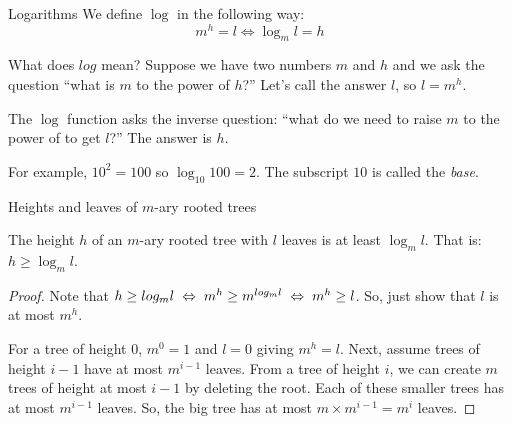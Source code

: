 \documentclass{beamer}
\begin{document}
  \begin{frame}{Logarithms}
    We define $\log$ in the following way:
    \[ m^h = l \Leftrightarrow \log_m l = h \]
  
    \begin{alertblock}{What does $log$ mean?}
      Suppose we have two numbers $m$ and $h$ and we ask the question ``what is $m$ to the power of $h$?''
      Let's call the answer $l$, so $l = m^h$.
  
      The $\log$ function asks the inverse question: ``what do we need to raise $m$ to the power of to get $l$?''
      The answer is $h$.
  
      For example, $10^2 = 100$ so $\log_{10} 100 = 2$.
      The subscript $10$ is called the \emph{base}.
    \end{alertblock}
  \end{frame}
  
  \begin{frame}{Heights and leaves of $m$-ary rooted trees}
    \begin{theorem}
      The height $h$ of an $m$-ary rooted tree with $l$ leaves is at least $\log_m l$.
      That is: $h \geq \log_m l$.
    \end{theorem}
    \begin{proof}
      Note that $h \geq log_m l \hspace{0.1cm} \Leftrightarrow \hspace{0.1cm} m^h \geq m^{log_m l} \hspace{0.1cm} \Leftrightarrow \hspace{0.1cm} m^h \geq l$.
      So, just show that $l$ is at most $m^h$.
      
      For a tree of height 0, $m^0 = 1$ and $l=0$ giving $m^h = l$.
      Next, assume trees of height $i-1$ have at most $m^{i-1}$ leaves.
      From a tree of height $i$, we can create $m$ trees of height at most $i-1$ by deleting the root.
      Each of these smaller trees has at most $m^{i-1}$ leaves.
      So, the big tree has at most $m \times m^{i-1} = m^i$ leaves.
    \end{proof}
  \end{frame}
  
  
  
\end{document}
